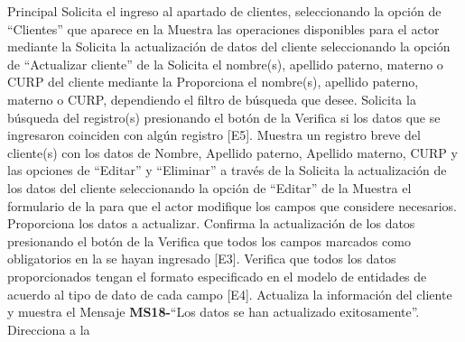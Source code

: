 	\begin{UCtrayectoria}{Principal}
		\UCpaso[\UCactor] Solicita el ingreso al apartado de clientes, seleccionando la opción de ``Clientes'' que aparece en la 
		\UCpaso Muestra las operaciones disponibles para el actor mediante la 
		\UCpaso[\UCactor] Solicita la actualización de datos del cliente seleccionando la opción de ``Actualizar cliente'' de la 
		\UCpaso Solicita el nombre(s), apellido paterno, materno o CURP del cliente mediante la 
		\UCpaso[\UCactor] Proporciona el nombre(s), apellido paterno, materno o CURP, dependiendo el filtro de búsqueda que desee.
		\UCpaso[\UCactor] Solicita la búsqueda del registro(s) presionando el botón  de la 
		\UCpaso Verifica si los datos que se ingresaron coinciden con algún registro [E5].
		\UCpaso Muestra un registro breve del cliente(s) con los datos de Nombre, Apellido paterno, Apellido materno, CURP y las opciones de ``Editar'' y ``Eliminar'' a través de la 
		\UCpaso[\UCactor] Solicita la actualización de los datos del cliente seleccionando la opción de ``Editar'' de la 
		\UCpaso Muestra el formulario de la  para que el actor modifique los campos que considere necesarios. 
		\UCpaso[\UCactor] Proporciona los datos a actualizar. 
		\UCpaso[\UCactor] Confirma la actualización de los datos presionando el botón  de la 
		\UCpaso Verifica que todos los campos marcados como obligatorios en la  se hayan ingresado [E3].
		\UCpaso Verifica que todos los datos proporcionados tengan el formato especificado en el modelo de entidades de acuerdo al tipo de dato de cada campo [E4].
		\UCpaso Actualiza la información del cliente y muestra el Mensaje {\bf MS18-}``Los datos se han actualizado exitosamente''.
		\UCpaso Direcciona a la 
	\end{UCtrayectoria}
	
